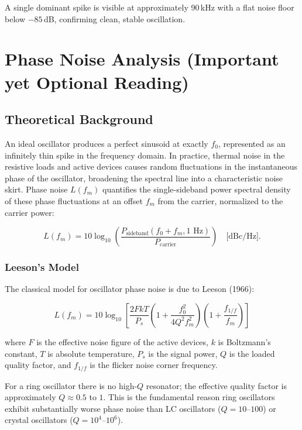 \documentclass[11pt]{article}
\begin{document}
A single dominant spike is visible at approximately 90\,kHz with a flat noise floor
below $-85$\,dB, confirming clean, stable oscillation.

\section{Phase Noise Analysis (Important yet Optional Reading)}
\subsection{Theoretical Background}

An ideal oscillator produces a perfect sinusoid at exactly $f_0$, represented as an
infinitely thin spike in the frequency domain. In practice, thermal noise in the resistive
loads and active devices causes random fluctuations in the instantaneous phase of the
oscillator, broadening the spectral line into a characteristic noise skirt. Phase noise
$L(f_m)$ quantifies the single-sideband power spectral density of these phase fluctuations
at an offset $f_m$ from the carrier, normalized to the carrier power:


\[
L(f_m) = 10 \log_{10}
\left(
\frac{P_{\text{sideband}}(f_0 + f_m, 1\text{ Hz})}{P_{\text{carrier}}}
\right)
\quad \text{[dBc/Hz]}.
\]



\subsubsection*{Leeson’s Model}

The classical model for oscillator phase noise is due to Leeson (1966):


\[
L(f_m) = 10 \log_{10}
\left[
\frac{2 F k T}{P_s}
\left(
1 + \frac{f_0^2}{4 Q^2 f_m^2}
\right)
\left(
1 + \frac{f_{1/f}}{f_m}
\right)
\right]
\tag{9}
\]



where $F$ is the effective noise figure of the active devices, $k$ is Boltzmann’s constant,
$T$ is absolute temperature, $P_s$ is the signal power, $Q$ is the loaded quality factor,
and $f_{1/f}$ is the flicker noise corner frequency.

For a ring oscillator there is no high-$Q$ resonator; the effective quality factor is
approximately $Q \approx 0.5$ to $1$. This is the fundamental reason ring oscillators
exhibit substantially worse phase noise than LC oscillators ($Q = 10$--$100$) or crystal
oscillators ($Q = 10^4$--$10^6$).
\end{document}

